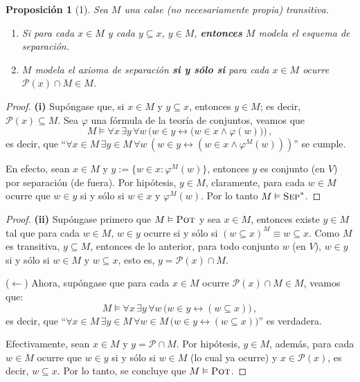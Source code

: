 \documentclass[letterpaper,DIV=15,12pt]{scrartcl}
\theoremstyle{manual}
\newtheorem{proposicion}{Proposición}
\newcommand{\tq}{:}
\begin{document}
    \begin{proposicion}[1]\itshape
        Sea $M$ una calse (no necesariamente propia) transitiva.
        \begin{enumerate}
            \item Si para cada $x \in M$ y cada $y \subseteq x$, $y \in M$, \textbf{entonces} $M$ modela el esquema de separación.
            \item $M$ modela el axioma de separación \textbf{si y sólo si} para cada $x \in M$ ocurre $\mathscr{P}(x) \cap M \in M$.
        \end{enumerate}
    \end{proposicion}
    \begin{proof}\textbf{(i)}
        Supóngase que, si $x \in M$ y $y \subseteq x$, entonces $y \in M$; es decir, $\mathscr{P}(x) \subseteq M$. Sea $\varphi$ una fórmula de la teoría de conjuntos, veamos que
        \[ M \vDash \forall x \, \exists y \, \forall w \, \Big( w \in y \leftrightarrow \big( w \in x \land \varphi(w) \big) \Big) \, , \]
        es decir, que ``$\forall x \in M \, \exists y \in M \, \forall w \, (w \in y \leftrightarrow (w \in x \land \varphi^M(w)))$'' se cumple.

        En efecto, sean $x \in M$ y $y:=\{ w \in x \tq \varphi^M (w) \}$, entonces $y$ es conjunto (en $V$) por separación (de fuera). Por hipótesis, $y \in M$, claramente, para cada $w \in M$ ocurre que $w \in y$ si y sólo si $w \in x$ y $\varphi^M(w)$. Por lo tanto $M \vDash \operatorname*{\textsc{Sep}}^*$.
    \end{proof}
    \begin{proof}\textbf{(ii)}
        Supóngase primero que $M \vDash \operatorname*{\textsc{Pot}}$ y sea $x \in M$, entonces existe $y \in M$ tal que para cada $w \in M$, $w \in y$ ocurre si y sólo si $(w \subseteq x)^M \equiv w \subseteq x$. Como $M$ es transitiva, $y \subseteq M$, entonces de lo anterior, para todo conjunto $w$ (en $V$), $w \in y$ si y sólo si $w \in M$ y $w \subseteq x$, esto es, $y = \mathscr{P}(x) \cap M$.

        ($\leftarrow$) Ahora, supóngase que para cada $x \in M$ ocurre $\mathscr{P}(x) \cap M \in M$, veamos que:
        \[ M \vDash \forall x \, \exists y \, \forall w \, \big( w \in y \leftrightarrow ( w \subseteq x ) \big) \, , \]
        es decir, que ``$\forall x \in M \, \exists y \in M \, \forall w \in M \, \big( w \in y \leftrightarrow ( w \subseteq x ) \big)$'' es verdadera.

        Efectivamente, sean $x \in M$ y $y=\mathscr{P} \cap M$. Por hipótesis, $y \in M$, además, para cada $w \in M$ ocurre que $w \in y$ si y sólo si $w \in M$ (lo cual ya ocurre) y $x \in \mathscr{P}(x)$, es decir, $w \subseteq x$. Por lo tanto, se concluye que $M \vDash \operatorname*{\textsc{Pot}}$.
    \end{proof}
\end{document}
